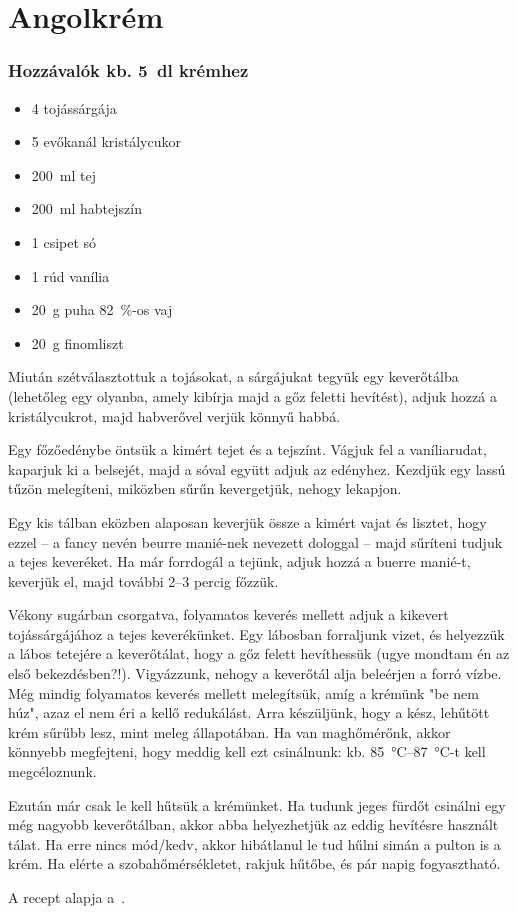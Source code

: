 \newpage
\section{Angolkrém} \label{sec:angolkem}

\subsubsection*{Hozzávalók kb. \qty{5}{\deci\l} krémhez}
\begin{itemize}
    \item \num{4} tojássárgája
    \item \num{5} evőkanál kristálycukor
    \item \qty{200}{\ml} tej
    \item \qty{200}{\ml} habtejszín
    \item \num{1} csipet só
    \item \num{1} rúd vanília
    \item \qty{20}{\g} puha \qty{82}{\percent}-os vaj
    \item \qty{20}{\g} finomliszt
\end{itemize}

Miután szétválasztottuk a tojásokat, a sárgájukat tegyük egy keverőtálba (lehetőleg egy olyanba, amely kibírja majd a gőz feletti hevítést), adjuk hozzá a kristálycukrot, majd habverővel verjük könnyű habbá.

Egy főzőedénybe öntsük a kimért tejet és a tejszínt. Vágjuk fel a vaníliarudat, kaparjuk ki a belsejét, majd a sóval együtt adjuk az edényhez. Kezdjük egy lassú tűzön melegíteni, miközben sűrűn kevergetjük, nehogy lekapjon.

Egy kis tálban eközben alaposan keverjük össze a kimért vajat és lisztet, hogy ezzel -- a fancy nevén beurre manié-nek nevezett dologgal -- majd sűríteni tudjuk a tejes keveréket. Ha már forrdogál a tejünk, adjuk hozzá a buerre manié-t, keverjük el, majd további \numrange{2}{3} percig főzzük.

Vékony sugárban csorgatva, folyamatos keverés mellett adjuk a kikevert tojássárgájához a tejes keverékünket. Egy lábosban forraljunk vizet, és helyezzük a lábos tetejére a keverőtálat, hogy a gőz felett hevíthessük (ugye mondtam én az első bekezdésben?!). Vigyázzunk, nehogy a keverőtál alja beleérjen a forró vízbe. Még mindig folyamatos keverés mellett melegítsük, amíg a krémünk "be nem húz", azaz el nem éri a kellő redukálást. Arra készüljünk, hogy a kész, lehűtött krém sűrűbb lesz, mint meleg állapotában. Ha van maghőmérőnk, akkor könnyebb megfejteni, hogy meddig kell ezt csinálnunk: kb. \qtyrange{85}{87}{\celsius}-t kell megcéloznunk.

Ezután már csak le kell hűtsük a krémünket. Ha tudunk jeges fürdőt csinálni egy még nagyobb keverőtálban, akkor abba helyezhetjük az eddig hevítésre használt tálat. Ha erre nincs mód/kedv, akkor hibátlanul le tud hűlni simán a pulton is a krém. Ha elérte a szobahőmérsékletet, rakjuk hűtőbe, és pár napig fogyasztható.


A recept alapja a~\cite{szell_angolkrem}.
